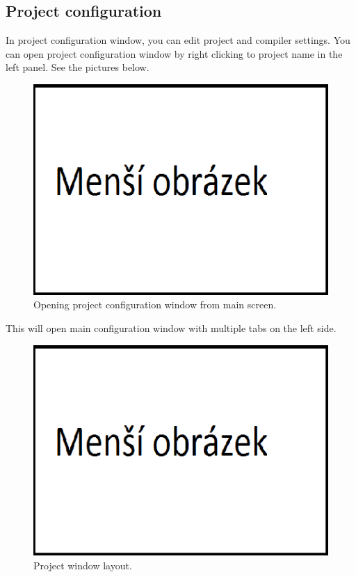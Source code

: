 \clearpage
\enlargethispage{6\baselineskip}
\subsection{Project configuration}
    In project configuration window, you can edit project and compiler settings. You can open project configuration window by right clicking to project name in the left panel. See the pictures below.
    \begin{figure}[h]
        \centering{}
        \includegraphics[width=.9\textwidth]{img/mensi_obrazek.png}
        \caption{Opening project configuration window from main screen.}
    \end{figure}

    This will open main configuration window with multiple tabs on the left side.
    \begin{figure}[h!]
        \centering{}
        \includegraphics[width=.9\textwidth]{img/mensi_obrazek.png}
        \caption{Project window layout.}
    \end{figure}


